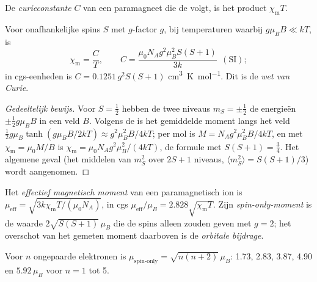 \begin{definition}[Curieconstante]\label{def:b3:complex-spectra-magnetism:curie}
De \emph{curieconstante} $C$ van een paramagneet die
de  volgt, is het product $\chi_{\mathrm m}T$.
\end{definition}

\begin{theorem}\label{thm:b3:complex-spectra-magnetism:curie}
Voor onafhankelijke spins $S$ met $g$-factor $g$, bij temperaturen waarbij $g\mu_BB \ll kT$, is
\[
  \chi_{\mathrm m} = \frac{C}{T}, \qquad C = \frac{\mu_0N_Ag^2\mu_B^2S(S+1)}{3k}\ \ (\text{SI});
\]
in cgs-eenheden is $C = 0.1251\,g^2S(S+1)$ \unit{cm^3.K.mol^{-1}}. Dit is de \emph{wet van Curie}.
\end{theorem}

\begin{proof}[Gedeeltelijk bewijs]
Voor $S = \frac12$ hebben de twee niveaus $m_S = \pm\frac12$ de energieën $\pm\frac12g\mu_BB$ in een veld $B$. Volgens de
 is het gemiddelde moment langs het veld $\frac12g\mu_B\tanh(g\mu_BB/2kT) \approx
g^2\mu_B^2B/4kT$; per mol is $M = N_Ag^2\mu_B^2B/4kT$, en met $\chi_{\mathrm m} = \mu_0M/B$ is $\chi_{\mathrm m} = \mu_0N_Ag^2\mu_B^2/(4kT)$,
de formule met $S(S+1) = \frac34$. Het algemene geval (het middelen van $m_S^2$ over $2S + 1$
niveaus, $\langle m_S^2\rangle = S(S+1)/3$) wordt aangenomen.
\end{proof}

\begin{definition}\label{def:b3:complex-spectra-magnetism:moment}
Het \emph{effectief magnetisch moment}
van een paramagnetisch ion is $\mu_{\mathrm{eff}} = \sqrt{3k\chi_{\mathrm m}T/(\mu_0N_A)}$, in cgs $\mu_{\mathrm{eff}}/\mu_B = 2.828\sqrt{\chi_{\mathrm m}T}$. Zijn
\emph{spin-only-moment} is de waarde $2\sqrt{S(S+1)}\,\mu_B$ die de
spins alleen zouden geven met $g = 2$; het overschot van het gemeten moment daarboven is
de \emph{orbitale bijdrage}.
\end{definition}

\begin{proposition}\label{prop:b3:complex-spectra-magnetism:spin-only}
Voor $n$ ongepaarde elektronen is $\mu_{\text{spin-only}} = \sqrt{n(n+2)}\,\mu_B$: 1.73, 2.83, 3.87, 4.90 en $5.92\,\mu_B$ voor
$n = 1$ tot 5.
\end{proposition}

